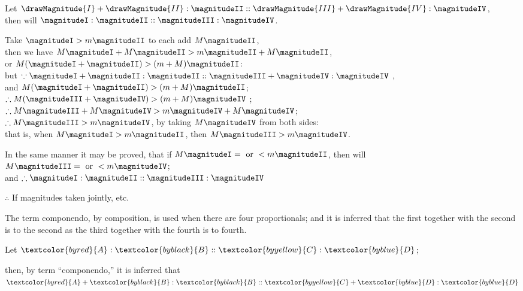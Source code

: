 \documentclass[booklanguage=english]{byrnebook}
\begin{document}
\begin{center}
Let $\drawMagnitude{I} + \drawMagnitude{II} : \magnitudeII :: \drawMagnitude{III} + \drawMagnitude{IV} : \magnitudeIV$,\\
then will $\magnitudeI : \magnitudeII :: \magnitudeIII : \magnitudeIV$.

Take $\magnitudeI > m \magnitudeII$ to each add $M \magnitudeII$,\\
then we have $M \magnitudeI + M \magnitudeII > m \magnitudeII + M \magnitudeII$,\\
or $M (\magnitudeI + \magnitudeII) > (m + M) \magnitudeII$:\\
but $\because \magnitudeI + \magnitudeII: \magnitudeII :: \magnitudeIII + \magnitudeIV: \magnitudeIV$ \byref{\hypref},\\ %
and $M (\magnitudeI + \magnitudeII) > (m + M) \magnitudeII$;\\
$\therefore M(\magnitudeIII + \magnitudeIV) > (m + M) \magnitudeIV$ ;\\
$\therefore M \magnitudeIII + M \magnitudeIV > m \magnitudeIV + M \magnitudeIV$;\\
$\therefore M \magnitudeIII > m \magnitudeIV$, by taking $M \magnitudeIV$ from both sides:\\
that is, when $M \magnitudeI > m \magnitudeII$, then $M \magnitudeIII > m \magnitudeIV$.

In the same manner it may be proved, that if $M \magnitudeI = \mbox{ or } < m \magnitudeII$, then will $M \magnitudeIII = \mbox{ or } < m \magnitudeIV$;\\
and $\therefore \magnitudeI : \magnitudeII :: \magnitudeIII : \magnitudeIV$ 

$\therefore$ If magnitudes taken jointly, etc.
\end{center}

\vfill\pagebreak

\label{def:V.XV} 
\def\varA{\textcolor{byred}{A}}
\def\varB{\textcolor{byblack}{B}}
\def\varC{\textcolor{byyellow}{C}}
\def\varD{\textcolor{byblue}{D}}
The term componendo, by composition, is used when there are four proportionals; and it is inferred that the first together with the second is to the second as the third together with the fourth is to fourth.

\begin{center}
Let $\varA : \varB :: \varC : \varD$;

then, by term \enquote{componendo,} it is inferred that\\
$\varA + \varB : \varB :: \varC + \varD: \varD$
\end{center}
\end{document}
